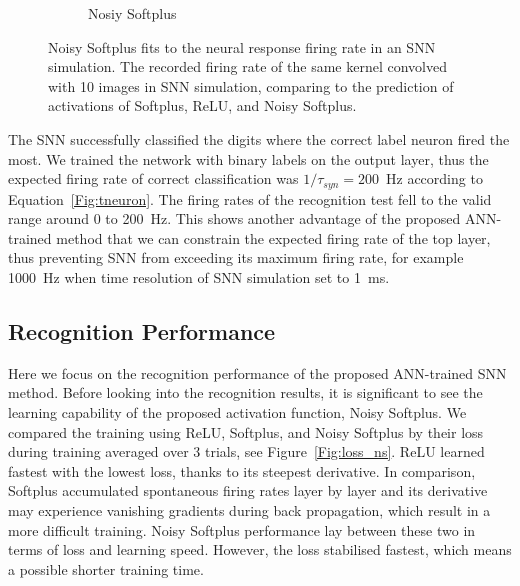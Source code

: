 \documentclass{article}
\begin{document}
\begin{figure}[hb!]
\begin{subfigure}[hb]{0.32\textwidth}
		\caption{Nosiy Softplus}
	\end{subfigure}
		\caption{Noisy Softplus fits to the neural response firing rate in an SNN simulation.
			The recorded firing rate of the same kernel convolved with 10 images in SNN simulation, comparing to the prediction of activations of Softplus, ReLU, and Noisy Softplus.}
		\label{fig:af_compare}
\end{figure}		

The SNN successfully classified the digits where the correct label neuron fired the most.
We trained the network with binary labels on the output layer, thus the expected firing rate of correct classification was $1/\tau_{syn}=200$~Hz according to Equation~\ref{Fig:tneuron}.
The firing rates of the recognition test fell to the valid range around 0 to 200~Hz.
This shows another advantage of the proposed ANN-trained method that we can constrain the expected firing rate of the top layer, thus preventing SNN from exceeding its maximum firing rate, for example 1000~Hz when time resolution of SNN simulation set to 1~ms.


\subsection{Recognition Performance}
\label{subsec:result_compare}
Here we focus on the recognition performance of the proposed ANN-trained SNN method.
Before looking into the recognition results, it is significant to see the learning capability of the proposed activation function, Noisy Softplus.
We compared the training using ReLU, Softplus, and Noisy Softplus by their loss during training averaged over 3 trials, see Figure~\ref{Fig:loss_ns}.
ReLU learned fastest with the lowest loss, thanks to its steepest derivative.
In comparison, Softplus accumulated spontaneous firing rates layer by layer and its derivative may experience vanishing gradients during back propagation, which result in a more difficult training.
Noisy Softplus performance lay between these two in terms of loss and learning speed.
However, the loss stabilised fastest, which means a possible shorter training time.
\end{document}

